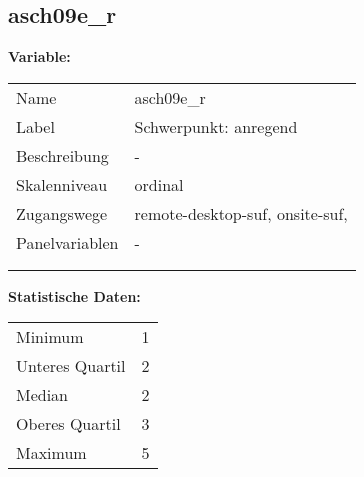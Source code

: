 	
	
	\subsection{asch09e\_r}
	\label{subSection:asch09e_r}

	\noindent\textbf{Variable:}\\
		\begin{tabular}{lL{11.3cm}}
			\label{tableVariable:asch09e_r}
			Name & asch09e\_r \\
			Label & Schwerpunkt: anregend \\
			Beschreibung & - \\
			Skalenniveau & ordinal \\
			Zugangswege &
				remote-desktop-suf,
				onsite-suf,
 \\
			Panelvariablen & -
			 \\
			 \\
 \\
		\end{tabular}



		\vspace*{1 cm}
		\noindent\textbf{Statistische Daten:}\\
			\begin{tabular}{ll}
				\label{tableStatistics:asch09e_r}
					Minimum & 1 \\
					Unteres Quartil & 2 \\
					Median & 2 \\
					Oberes Quartil & 3 \\
					Maximum & 5 \\
			\end{tabular}



